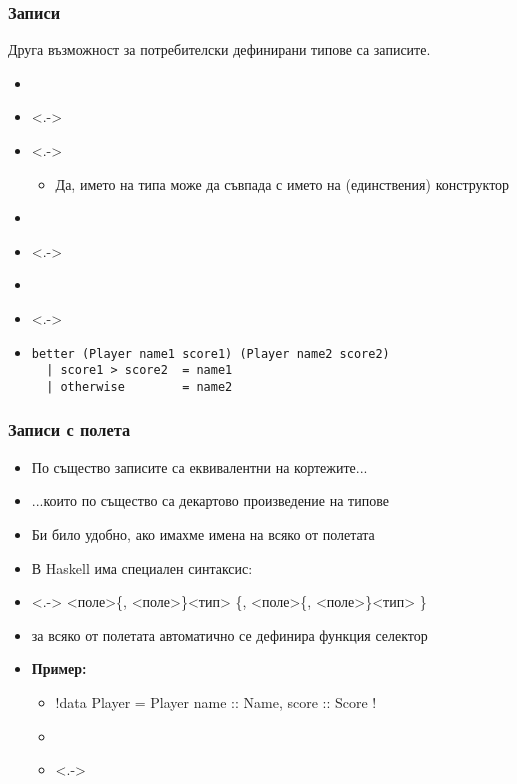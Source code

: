 \documentclass[alsotrans]{beamerswitch}
\begin{document}
\begin{frame}[fragile]
  \frametitle{Записи}
  Друга възможност за потребителски дефинирани типове са \alert{записите}.\\
  \pause
  \begin{itemize}[<+->]
  \item {}
  \item<.-> 
  \item<.-> 
    \begin{itemize}
    \item Да, името на типа може да съвпада с името на (единствения) конструктор
    \end{itemize}
  \item {}
  \item<.-> 
  \item {}
  \item<.-> 
  \item {}
    \begin{lstlisting}
better (Player name1 score1) (Player name2 score2)
  | score1 > score2  = name1
  | otherwise        = name2
    \end{lstlisting}
  \end{itemize}
\end{frame}

\begin{frame}[fragile]
  \frametitle{Записи с полета}
  \begin{itemize}[<+->]
  \item По същество записите са еквивалентни на кортежите...
  \item ...които по същество са декартово произведение на типове
  \item Би било удобно, ако имахме имена на всяко от полетата
  \item В Haskell има специален синтаксис:
  \item<.-> \tta{\{} <поле>\{, <поле>\}\tta{::}<тип> \{, <поле>\{, <поле>\}\tta{::}<тип> \}\tta{\}}
  \item за всяко от полетата автоматично се дефинира функция селектор
  \item \textbf{Пример:}
    \begin{itemize}
    \item \lst!data Player = Player { name :: Name, score :: Score }!
    \item {}
    \item<.-> 
    \end{itemize}
  \end{itemize}
\end{frame}
\end{document}
